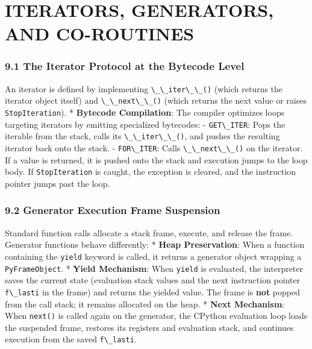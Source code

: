 \hypertarget{iterators-generators-and-co-routines}{%
\chapter{ITERATORS, GENERATORS, AND
CO-ROUTINES}\label{iterators-generators-and-co-routines}}

\hypertarget{the-iterator-protocol-at-the-bytecode-level}{%
\subsection{9.1 The Iterator Protocol at the Bytecode
Level}\label{the-iterator-protocol-at-the-bytecode-level}}

An iterator is defined by implementing
\passthrough{\lstinline!\_\_iter\_\_()!} (which returns the iterator
object itself) and \passthrough{\lstinline!\_\_next\_\_()!} (which
returns the next value or raises
\passthrough{\lstinline!StopIteration!}). * \textbf{Bytecode
Compilation}: The compiler optimizes loops targeting iterators by
emitting specialized bytecodes: - \passthrough{\lstinline!GET\_ITER!}:
Pops the iterable from the stack, calls its
\passthrough{\lstinline!\_\_iter\_\_()!}, and pushes the resulting
iterator back onto the stack. - \passthrough{\lstinline!FOR\_ITER!}:
Calls \passthrough{\lstinline!\_\_next\_\_()!} on the iterator. If a
value is returned, it is pushed onto the stack and execution jumps to
the loop body. If \passthrough{\lstinline!StopIteration!} is caught, the
exception is cleared, and the instruction pointer jumps past the loop.

\hypertarget{generator-execution-frame-suspension}{%
\subsection{9.2 Generator Execution Frame
Suspension}\label{generator-execution-frame-suspension}}

Standard function calls allocate a stack frame, execute, and release the
frame. Generator functions behave differently: * \textbf{Heap
Preservation}: When a function containing the
\passthrough{\lstinline!yield!} keyword is called, it returns a
generator object wrapping a \passthrough{\lstinline!PyFrameObject!}. *
\textbf{Yield Mechanism}: When \passthrough{\lstinline!yield!} is
evaluated, the interpreter saves the current state (evaluation stack
values and the next instruction pointer
\passthrough{\lstinline!f\_lasti!} in the frame) and returns the yielded
value. The frame is \textbf{not} popped from the call stack; it remains
allocated on the heap. * \textbf{Next Mechanism}: When
\passthrough{\lstinline!next()!} is called again on the generator, the
CPython evaluation loop loads the suspended frame, restores its
registers and evaluation stack, and continues execution from the saved
\passthrough{\lstinline!f\_lasti!}.

